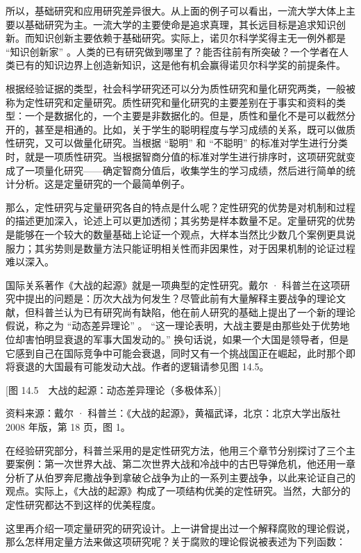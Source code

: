 所以，基础研究和应用研究差异很大。从上面的例子可以看出，一流大学大体上主要以基础研究为主。一流大学的主要使命是追求真理，其长远目标是追求知识创新。而知识创新主要依赖于基础研究。实际上，诺贝尔科学奖得主无一例外都是 “知识创新家” 。人类的已有研究做到哪里了？能否往前有所突破？一个学者在人类已有的知识边界上创造新知识，这是他有机会赢得诺贝尔科学奖的前提条件。

根据经验证据的类型，社会科学研究还可以分为质性研究和量化研究两类，一般被称为定性研究和定量研究。质性研究和量化研究的主要差别在于事实和资料的类型：一个是数据化的，一个主要是非数据化的。但是，质性和量化不是可以截然分开的，甚至是相通的。比如，关于学生的聪明程度与学习成绩的关系，既可以做质性研究，又可以做量化研究。当根据 “聪明” 和 “不聪明” 的标准对学生进行分类时，就是一项质性研究。当根据智商分值的标准对学生进行排序时，这项研究就变成了一项量化研究——确定智商分值后，收集学生的学习成绩，然后进行简单的统计分析。这是定量研究的一个最简单例子。

那么，定性研究与定量研究各自的特点是什么呢？定性研究的优势是对机制和过程的描述更加深入，论述上可以更加透彻；其劣势是样本数量不足。定量研究的优势是能够在一个较大的数量基础上论证一个观点，大样本当然比少数几个案例更具说服力；其劣势则是数量方法只能证明相关性而非因果性，对于因果机制的论证过程难以深入。

国际关系著作《大战的起源》就是一项典型的定性研究。戴尔 · 科普兰在这项研究中提出的问题是：历次大战为何发生？尽管此前有大量解释主要战争的理论文献，但科普兰认为已有研究尚有缺陷，他在前人研究的基础上提出了一个新的理论假说，称之为 “动态差异理论” 。 “这一理论表明，大战主要是由那些处于优势地位却害怕明显衰退的军事大国发动的。” 换句话说，如果一个大国是领导者，但是它感到自己在国际竞争中可能会衰退，同时又有一个挑战国正在崛起，此时那个即将衰退的大国最有可能发动大战。作者的逻辑请参见图 14.5。

[图 14.5　大战的起源：动态差异理论（多极体系）]

资料来源：戴尔 · 科普兰：《大战的起源》，黄福武译，北京：北京大学出版社 2008 年版，第 18 页，图 1。

在经验研究部分，科普兰采用的是定性研究方法，他用三个章节分别探讨了三个主要案例：第一次世界大战、第二次世界大战和冷战中的古巴导弹危机，他还用一章分析了从伯罗奔尼撒战争到拿破仑战争为止的一系列主要战争，以此来论证自己的观点。实际上，《大战的起源》构成了一项结构优美的定性研究。当然，大部分的定性研究都达不到这样的优美程度。

这里再介绍一项定量研究的研究设计。上一讲曾提出过一个解释腐败的理论假说，那么怎样用定量方法来做这项研究呢？关于腐败的理论假说被表述为下列函数：

